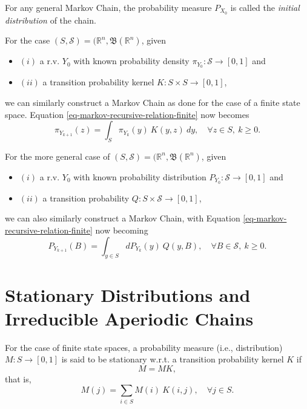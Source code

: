 For any general Markov Chain, the probability measure $P_{X_0}$ is called the {\it initial distribution} of the chain.

For the case $(S,\mathcal{S})=(\mathbb{R}^n,\mathfrak{B}(\mathbb{R}^n)$, given
{\renewcommand{\labelitemi}{}
\begin{itemize}
\item $(i)$ a r.v. $Y_0$ with known probability density $\pi_{Y_0}:\mathcal{S}\rightarrow [0,1]$ and
\item $(ii)$ a transition probability kernel $K:S\times S\rightarrow [0,1]$,
\end{itemize}
}
we can similarly construct a Markov Chain as done for the case of a finite state space.
Equation \eqref{eq-markov-recursive-relation-finite} now becomes
\begin{equation}\label{eq-markov-recursive-relation-Rac}
\pi_{Y_{k+1}}(z) = \int_{S}\pi_{Y_k}(y)~K(y,z)~dy,\quad\forall z\in S,~k\geqslant 0.
\end{equation}

For the more general case of $(S,\mathcal{S})=(\mathbb{R}^n,\mathfrak{B}(\mathbb{R}^n)$, given
{\renewcommand{\labelitemi}{}
\begin{itemize}
\item $(i)$ a r.v. $Y_0$ with known probability distribution $P_{Y_0}:\mathcal{S}\rightarrow [0,1]$ and
\item $(ii)$ a transition probability $Q:S\times\mathcal{S}\rightarrow [0,1]$,
\end{itemize}
}
we can also similarly construct a Markov Chain, with
Equation \eqref{eq-markov-recursive-relation-finite} now becoming
\begin{equation}\label{eq-markov-recursive-relation-R}
P_{Y_{k+1}}(B) = \int_{y\in S}dP_{Y_k}(y)~Q(y,B),\quad\forall B\in\mathcal{S},~k\geqslant 0.
\end{equation}

\section{Stationary Distributions and Irreducible Aperiodic Chains}

For the case of finite state spaces,
a probability measure (i.e., distribution) $M:S\rightarrow [0,1]$ is said to be stationary w.r.t. a transition probability kernel $K$ if
\begin{equation*}
M = MK,
\end{equation*}
that is,
\begin{equation}\label{eq-stationary-finite-distribution}
M(j) = \sum_{i\in S}M(i)~K(i,j),\quad\forall j\in S.
\end{equation}

